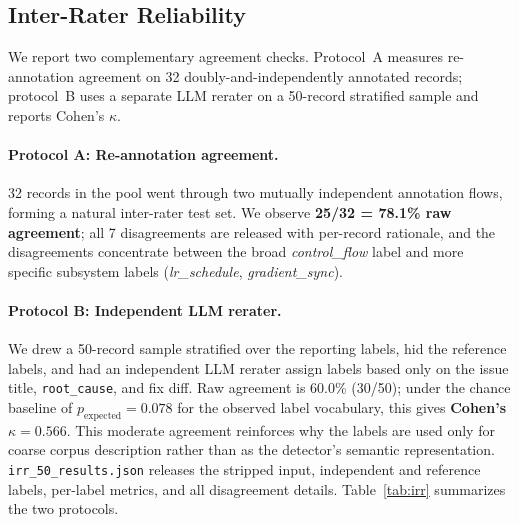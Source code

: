 \documentclass[sigconf,nonacm]{acmart}
\begin{document}
\subsection{Inter-Rater Reliability}
\label{app:method-irr}

We report two complementary agreement checks. Protocol~A measures
re-annotation agreement on 32 doubly-and-independently annotated records;
protocol~B uses a separate LLM rerater on a 50-record stratified sample and
reports Cohen's $\kappa$.

\paragraph{Protocol A: Re-annotation agreement.}
32 records in the pool went through two mutually independent annotation flows, forming a natural inter-rater test set. We observe \textbf{25/32 = 78.1\% raw agreement}; all 7 disagreements are released with per-record rationale, and the disagreements concentrate between the broad \textit{control\_flow} label and more specific subsystem labels (\textit{lr\_schedule}, \textit{gradient\_sync}).

\paragraph{Protocol B: Independent LLM rerater.}
We drew a 50-record sample stratified over the reporting labels, hid the
reference labels, and had an independent LLM rerater assign labels based only
on the issue title, \texttt{root\_cause}, and fix diff. Raw agreement is
60.0\% (30/50); under the chance baseline of
$p_{\text{expected}}=0.078$ for the observed label vocabulary, this gives
\textbf{Cohen's $\kappa=0.566$}. This moderate agreement reinforces why the
labels are used only for coarse corpus description rather than as the
detector's semantic representation. \texttt{irr\_50\_results.json} releases
the stripped input, independent and reference labels, per-label metrics, and
all disagreement details. Table~\ref{tab:irr} summarizes the two protocols.
\end{document}

